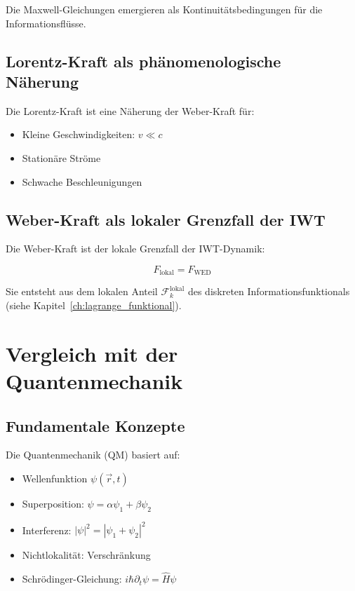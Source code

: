 Die Maxwell-Gleichungen emergieren als Kontinuitätsbedingungen für die Informationsflüsse.

\subsection{Lorentz-Kraft als phänomenologische Näherung}
\label{sub:vergleich_elektro_lorentz}

Die Lorentz-Kraft ist eine Näherung der Weber-Kraft für:

\begin{itemize}
    \item Kleine Geschwindigkeiten: \( v \ll c \)
    \item Stationäre Ströme
    \item Schwache Beschleunigungen
\end{itemize}

\subsection{Weber-Kraft als lokaler Grenzfall der IWT}
\label{sub:vergleich_elektro_weber}

Die Weber-Kraft ist der lokale Grenzfall der IWT-Dynamik:

\[
F_{\text{lokal}} = F_{\text{WED}}
\]

Sie entsteht aus dem lokalen Anteil \( \mathcal{F}_k^{\text{lokal}} \) des diskreten Informationsfunktionals (siehe Kapitel~\ref{ch:lagrange_funktional}).

\section{Vergleich mit der Quantenmechanik}
\label{app:vergleich_quantenmechanik}

\subsection{Fundamentale Konzepte}
\label{sub:vergleich_quanten_konzepte}

Die Quantenmechanik (QM) basiert auf:

\begin{itemize}
    \item Wellenfunktion \( \psi(\vec{r}, t) \)
    \item Superposition: \( \psi = \alpha\psi_1 + \beta\psi_2 \)
    \item Interferenz: \( |\psi|^2 = |\psi_1 + \psi_2|^2 \)
    \item Nichtlokalität: Verschränkung
    \item Schrödinger-Gleichung: \( i\hbar\partial_t\psi = \hat{H}\psi \)
\end{itemize}

